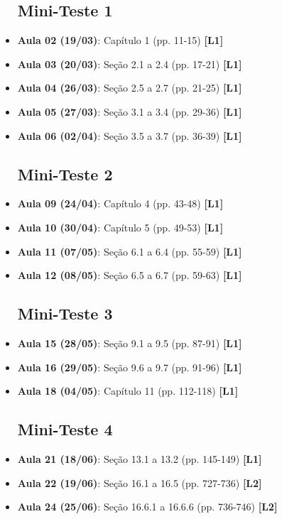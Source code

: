 \documentclass[12pt,a4paper,oneside]{article}
\begin{document}
\begin{itemize}
	
	\subsection{Mini-Teste 1}
	
	\item[] {\bf Aula 02 (19/03)}: Capítulo 1 (pp. 11-15) {\bf \color{blue} [L1]}
	\item[] {\bf Aula 03 (20/03)}: Seção 2.1 a 2.4 (pp. 17-21) {\bf \color{blue} [L1]}
	\item[] {\bf Aula 04 (26/03)}: Seção 2.5 a 2.7 (pp. 21-25) {\bf \color{blue} [L1]}
	\item[] {\bf Aula 05 (27/03)}: Seção 3.1 a 3.4 (pp. 29-36) {\bf \color{blue} [L1]}
	\item[] {\bf Aula 06 (02/04)}: Seção 3.5 a 3.7 (pp. 36-39) {\bf \color{blue} [L1]}
	
	\subsection{Mini-Teste 2}
	
	\item[] {\bf Aula 09 (24/04)}: Capítulo 4 (pp. 43-48) {\bf \color{blue} [L1]}
	\item[] {\bf Aula 10 (30/04)}: Capítulo 5 (pp. 49-53) {\bf \color{blue} [L1]}
	\item[] {\bf Aula 11 (07/05)}: Seção 6.1 a 6.4 (pp. 55-59) {\bf \color{blue} [L1]}
	\item[] {\bf Aula 12 (08/05)}: Seção 6.5 a 6.7 (pp. 59-63) {\bf \color{blue} [L1]}
	
	\subsection{Mini-Teste 3}
	
	\item[] {\bf Aula 15 (28/05)}: Seção 9.1 a 9.5 (pp. 87-91) {\bf \color{blue} [L1]}
	\item[] {\bf Aula 16 (29/05)}: Seção 9.6 a 9.7 (pp. 91-96) {\bf \color{blue} [L1]}
	\item[] {\bf Aula 18 (04/05)}: Capítulo 11 (pp. 112-118) {\bf \color{blue} [L1]}
	
	\subsection{Mini-Teste 4}
	
	\item[] {\bf Aula 21 (18/06)}: Seção 13.1 a 13.2 (pp. 145-149) {\bf \color{blue} [L1]}
	\item[] {\bf Aula 22 (19/06)}: Seção 16.1 a 16.5 (pp. 727-736) {\bf \color{purple} [L2]}
	\item[] {\bf Aula 24 (25/06)}: Seção 16.6.1 a 16.6.6 (pp. 736-746) 
	{\bf \color{purple} [L2]}
	
\end{itemize}
\end{document}
